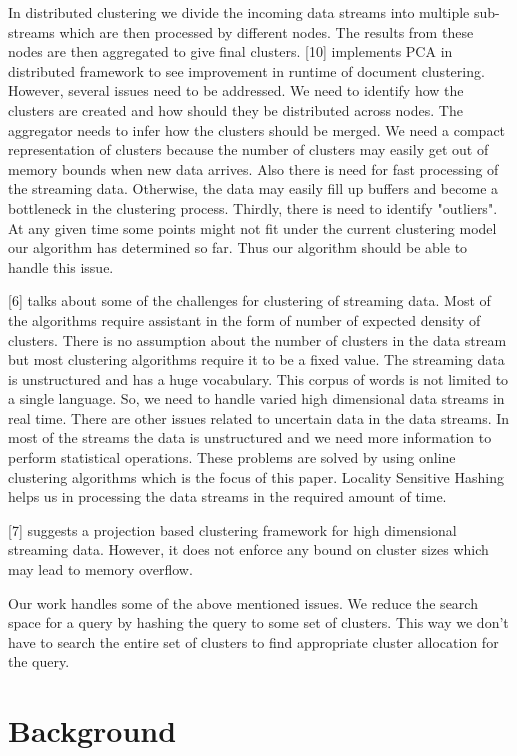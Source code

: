 \documentclass{article} %
\begin{document}
 In distributed clustering we divide the incoming data streams into multiple sub-streams which are then processed by different nodes. The results from these nodes are then aggregated to give final clusters. [10] implements PCA in distributed framework to see improvement in runtime of document clustering. However, several issues need to be addressed. We need to identify how the clusters are created and how should they be distributed across nodes. The aggregator needs to infer how the clusters should be merged. We need a compact representation of clusters because the number of clusters may easily get out of memory bounds when new data arrives. Also there is need for fast processing of the streaming data. Otherwise, the data may easily fill up buffers and become a bottleneck in the clustering process. Thirdly, there is need to identify "outliers". At any given time some points might not fit under the current clustering model our algorithm has determined so far. Thus our algorithm should be able to handle this issue.


 [6] talks about some of the challenges for clustering of streaming data. Most of the algorithms require assistant in the form of number of expected density of clusters. There is no assumption about the number of clusters in the data stream but most clustering algorithms require it to be a fixed value. The streaming data is unstructured and has a huge vocabulary. This corpus of words is not limited to a single language. So, we need to handle varied high dimensional data streams in real time. There are other issues related to uncertain data in the data streams. In most of the streams the data is unstructured and we need more information to perform statistical operations. These problems are solved by using online clustering algorithms which is the focus of this paper. Locality Sensitive Hashing helps us in processing the data streams in the required amount of time.
 
 [7] suggests a projection based clustering framework for high dimensional streaming data. However, it does not enforce any bound on cluster sizes which may lead to memory overflow.
 
 Our work handles some of the above mentioned issues. We reduce the search space for a query by hashing the query to some set of clusters. This way we don't have to search the entire set of clusters to find appropriate cluster allocation for the query.

\section{Background}
\end{document}
